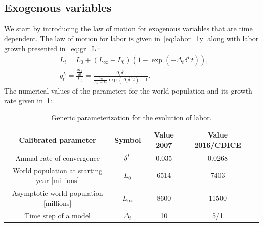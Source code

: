 \documentclass[11pt, a4paper, pdftex, twoside, dvipsnames]{article}
\begin{document}
\begin{appendices}
\subsection{Exogenous variables}
\label{sec:generic_exo}
We start by introducing the law of motion for exogenous variables that are time dependent. The law of motion for labor is given in~\cref{eq:labor_1y} along with labor growth presented in~\cref{eq:gr_L}: 
\begin{align}
\label{eq:labor_1y}
    & L_{t} = L_{0} + \left(L_{\infty}-L_{0}\right) \left(1-\exp\left(-\Delta_t\delta^{L}t\right)\right), 
    \\
    \label{eq:gr_L}
    & g^{L}_{t}= \frac{\frac{dL_{t}}{dt}}{L_t}=\frac{\Delta_t\delta^{L}}{\frac{L_{\infty}}{L_{\infty}-L_{0}}\exp\left(\Delta_t\delta^{L}t\right)-1}.
\end{align}
%
The numerical values of the parameters for the world population and its growth rate given in~\cref{table:Labor}:
\begin{table}[H]
\centering
\begin{tabular}{ c c c c c  } 
 \toprule
 Calibrated parameter & Symbol  & Value 2007 & Value 2016/CDICE \\ 
 \midrule
 Annual rate of convergence & $\delta^L$  & 0.035 & 0.0268   \\ 
 World population at starting year [millions] & $L_0$  & 6514 & 7403 \\ 
 Asymptotic world population [millions] & $L_{\infty}$  & 8600 & 11500 \\ 
 Time step of a model & $\Delta_t$  & 10 & 5/1 \\
 \bottomrule
\end{tabular}
\caption{Generic parameterization for the evolution of labor.}
\label{table:Labor}
\end{table}


\end{appendices}
\end{document}
